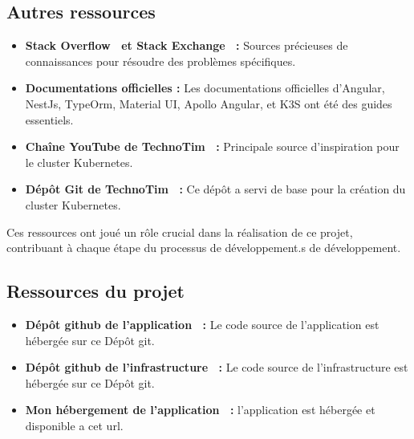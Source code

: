 \subsection{Autres ressources}\label{subsec:autres-ressources}
\begin{itemize}
    \item \textbf{Stack Overflow~\cite{StackOve24:online} et Stack Exchange~\cite{HotQuest86:online} :} Sources précieuses de connaissances pour résoudre des problèmes spécifiques.
    \item \textbf{Documentations officielles :} Les documentations officielles d'Angular, NestJs, TypeOrm, Material UI, Apollo Angular, et K3S ont été des guides essentiels.
    \item \textbf{Chaîne YouTube de TechnoTim~\cite{1TechnoT44:online} :} Principale source d'inspiration pour le cluster Kubernetes.
    \item \textbf{Dépôt Git de TechnoTim~\cite{technoti52:online} :} Ce dépôt a servi de base pour la création du cluster Kubernetes.
\end{itemize}

Ces ressources ont joué un rôle crucial dans la réalisation de ce projet, contribuant à chaque étape du processus de développement.s de développement.

\subsection{Ressources du projet}\label{subsec:ressources-du-projet}
\begin{itemize}
    \item \textbf{Dépôt github de l'application~\cite{craftbra13:online} :} Le code source de l'application est hébergée sur ce Dépôt git.
    \item \textbf{Dépôt github de l'infrastructure~\cite{craftbra86:online} :} Le code source de l'infrastructure est hébergée sur ce Dépôt git.
    \item \textbf{Mon hébergement de l'application~\cite{CleverPa16:online} :} l'application est hébergée et disponible a cet \Gls{url}.
\end{itemize}
